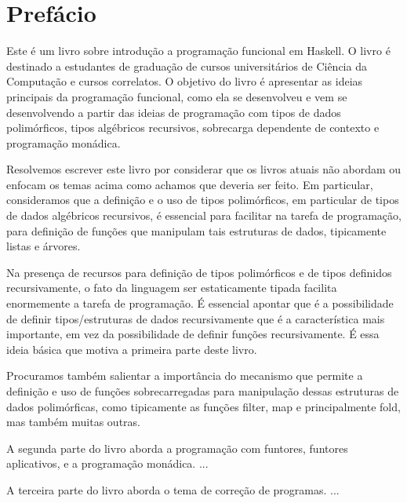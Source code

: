\chapter{Prefácio}

Este é um livro sobre introdução a programação funcional em Haskell.
O livro é destinado a estudantes de graduação de cursos universitários
de Ciência da Computação e cursos correlatos. O objetivo do livro é
apresentar as ideias principais da programação funcional, como ela se
desenvolveu e vem se desenvolvendo a partir das ideias de programação
com tipos de dados polimórficos, tipos algébricos recursivos,
sobrecarga dependente de contexto e programação monádica.

Resolvemos escrever este livro por considerar que os livros atuais não
abordam ou enfocam os temas acima como achamos que deveria ser
feito. Em particular, consideramos que a definição e o uso de tipos
polimórficos, em particular de tipos de dados algébricos recursivos, é
essencial para facilitar na tarefa de programação, para definição de
funções que manipulam tais estruturas de dados, tipicamente listas e
árvores.

Na presença de recursos para definição de tipos polimórficos e de
tipos definidos recursivamente, o fato da linguagem ser estaticamente
tipada facilita enormemente a tarefa de programação. É essencial
apontar que é a possibilidade de definir tipos/estruturas de dados
recursivamente que é a característica mais importante, em vez da
possibilidade de definir funções recursivamente. É essa ideia básica
que motiva a primeira parte deste livro.

Procuramos também salientar a importância do mecanismo que permite a
definição e uso de funções sobrecarregadas para manipulação dessas
estruturas de dados polimórficas, como tipicamente as funções filter,
map e principalmente fold, mas também muitas outras.

A segunda parte do livro aborda a programação com funtores, funtores
aplicativos, e a programação monádica. ...

A terceira parte do livro aborda o tema de correção de programas. ...





